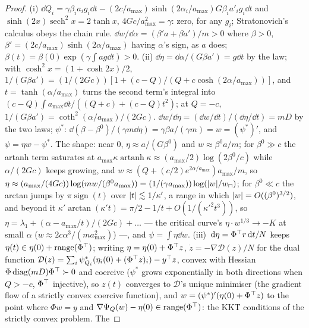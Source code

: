 \begin{proof}
(i) $\dd Q_i = \gamma\beta_ia_ig_i\dd t - (2c/a_{\max})\sinh(2\alpha_i/a_{\max})G\beta_ia'_ig_i\dd t$ and
$\sinh(2x)\operatorname{sech}^2x = 2\tanh x$, $4Gc/a_{\max}^2 = \gamma$: zero, for any $g_i$; Stratonovich's calculus
obeys the chain rule. $\dd w/\dd\alpha = (\beta'a + \beta a')/m > 0$ where $\beta > 0$,
$\beta' = (2c/a_{\max})\sinh(2\alpha/a_{\max})$ having $\alpha$'s sign, as $a$ does;
$\beta(t) = \beta(0)\exp(\gamma\int ag\dd t) > 0$. (ii) $\dd\eta = \dd\alpha/(G\beta a') = g\dd t$ by the law; with
$\cosh^2x = (1 + \cosh2x)/2$, $1/(G\beta a') = (1/(2Gc))[1 + (c - Q)/(Q + c\cosh(2\alpha/a_{\max}))]$, and
$t = \tanh(\alpha/a_{\max})$ turns the second term's integral into
$(c - Q)\int a_{\max}\dd t/((Q + c) + (c - Q)t^2)$; at $Q = -c$, $1/(G\beta a') = \coth^2(\alpha/a_{\max})/(2Gc)$.
$\dd w/\dd\eta = (\dd w/\dd t)/(\dd\eta/\dd t) = mD$ by the two laws; $\psi^*$:
$\dd(\beta - \beta^0)/(\gamma m\dd\eta) = \gamma\beta a/(\gamma m) = w = (\psi^*)'$, and $\psi = \eta w - \psi^*$. The
shape: near 0, $\eta\approx a/(G\beta^0)$ and $w\approx\beta^0a/m$; for $\beta^0\gg c$ the artanh term saturates at
$a_{\max}\kappa\operatorname{artanh}\kappa\approx(a_{\max}/2)\log(2\beta^0/c)$ while $\alpha/(2Gc)$ keeps growing, and
$w\approx(Q + (c/2)e^{2\alpha/a_{\max}})a_{\max}/m$, so
$\eta\approx(a_{\max}/(4Gc))\log(mw/(\beta^0a_{\max})) = (1/(\gamma a_{\max}))\log(\lvert w\rvert/w_\sqcap)$; for
$\beta^0\ll c$ the arctan jumps by $\pi\operatorname{sign}(t)$ over $\lvert t\rvert\lesssim1/\kappa'$, a range in which
$\lvert w\rvert = O((\beta^0)^{3/2})$, and beyond it $\kappa'\arctan(\kappa't) = \pi/2 - 1/t + O(1/(\kappa'^2t^3))$, so
$\eta = \lambda_1 + (\alpha - a_{\max}/t)/(2Gc) + \dots$ --- the critical curve's $\eta\cdot w^{1/3}\to-K$ at small
$\alpha$ ($w\approx2c\alpha^3/(ma_{\max}^2)$) ---, and $\psi = \int\eta\dd w$. (iii) $\,\mathrm{d}\eta = \Phi^\top r\,\mathrm{d} t/N$ keeps
$\eta(t)\in\eta(0) + \operatorname{range}(\Phi^\top)$; writing $\eta = \eta(0) + \Phi^\top z$,
$\dot z = -\nabla\mathcal D(z)/N$ for the dual function
$\mathcal D(z) = \sum_i\psi^*_{Q_i}(\eta_i(0) + (\Phi^\top z)_i) - y^\top z$, convex with Hessian
$\Phi\operatorname{diag}(mD)\Phi^\top\succ0$ and coercive ($\psi^*$ grows exponentially in both directions when
$Q > -c$, $\Phi^\top$ injective), so $z(t)$ converges to $\mathcal D$'s unique minimiser (the gradient flow of a strictly
convex coercive function), and $w = (\psi^*)'(\eta(0) + \Phi^\top z)$ to the point where $\Phi w = y$ and
$\nabla\Psi_Q(w) - \eta(0)\in\operatorname{range}(\Phi^\top)$: the KKT conditions of the strictly convex problem. The

\end{proof}
